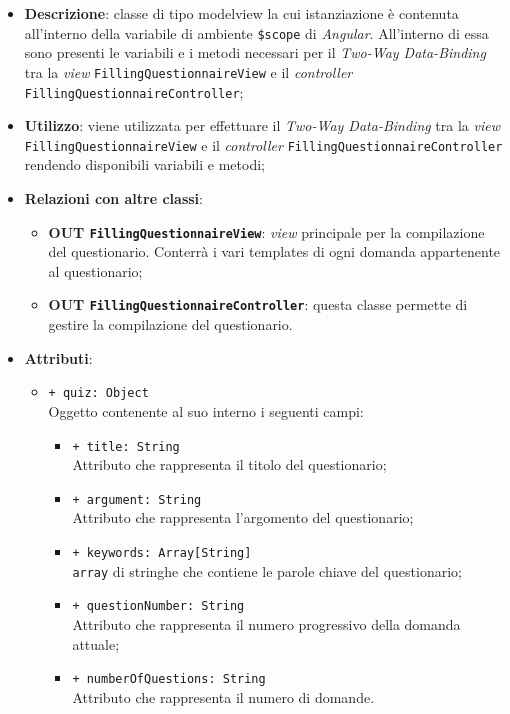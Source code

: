 	\begin{itemize}
		\item \textbf{Descrizione}: classe di tipo modelview la cui istanziazione è contenuta all'interno della variabile di ambiente \texttt{\$scope} di \textit{Angular}. All'interno di essa sono presenti le variabili e i metodi necessari per il \textit{Two-Way Data-Binding} tra la \textit{view} \texttt{FillingQuestionnaireView} e il \textit{controller} \texttt{FillingQuestionnaireController};
		\item \textbf{Utilizzo}: viene utilizzata per effettuare il \textit{Two-Way Data-Binding} tra la \textit{view}\\ \texttt{FillingQuestionnaireView} e il \textit{controller} \texttt{FillingQuestionnaireController} rendendo disponibili variabili e metodi;
		\item \textbf{Relazioni con altre classi}: 
		\begin{itemize}
			\item \textbf{OUT \texttt{FillingQuestionnaireView}}: \textit{view} principale per la compilazione del questionario. Conterrà i vari templates di ogni domanda appartenente al questionario; 
			\item \textbf{OUT \texttt{FillingQuestionnaireController}}: questa classe permette di gestire la compilazione del questionario.
		\end{itemize}
		\item \textbf{Attributi}: 
		\begin{itemize}
			\item \texttt{+ quiz: Object} \\ Oggetto contenente al suo interno i seguenti campi:
			\begin{itemize}
				\item \texttt{+ title: String} \\ Attributo che rappresenta il titolo del questionario;
				\item \texttt{+ argument: String} \\ Attributo che rappresenta l'argomento del questionario;
				\item \texttt{+ keywords: Array[String]} \\ \texttt{array} di stringhe che contiene le parole chiave del questionario;
				\item \texttt{+ questionNumber: String} \\ Attributo che rappresenta il numero progressivo della domanda attuale;
				\item \texttt{+ numberOfQuestions: String} \\ Attributo che rappresenta il numero di domande.

\end{itemize}
\end{itemize}
\end{itemize}
